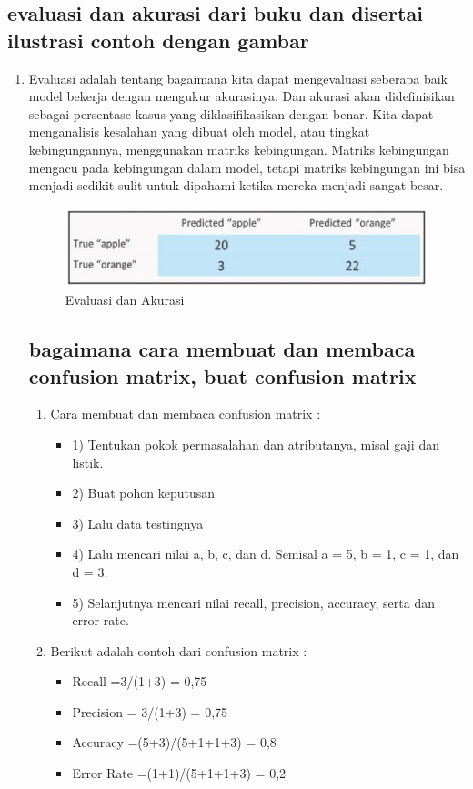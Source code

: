 \begin{enumerate}
\subsection{evaluasi dan akurasi dari buku dan disertai ilustrasi contoh
dengan gambar}
\begin{enumerate}
\item Evaluasi adalah tentang  bagaimana kita dapat mengevaluasi seberapa baik model bekerja dengan mengukur akurasinya. Dan akurasi akan didefinisikan sebagai persentase kasus yang diklasifikasikan dengan benar. Kita dapat menganalisis kesalahan yang dibuat oleh model, atau tingkat kebingungannya, menggunakan matriks kebingungan. Matriks kebingungan mengacu pada kebingungan dalam model, tetapi matriks kebingungan ini bisa menjadi sedikit sulit untuk dipahami ketika mereka menjadi sangat besar.
\begin{figure}[ht]
\centering
\includegraphics[scale=0.5]{figures/f9.jpg}
\caption{ Evaluasi dan Akurasi}
\label{contoh}
\end{figure}

\subsection{ bagaimana cara membuat dan membaca confusion matrix, buat confusion matrix }
\begin{enumerate}
\item Cara membuat dan membaca confusion matrix :
\begin{itemize}
\item 1)	Tentukan pokok permasalahan dan atributanya, misal gaji dan listik.
\item 2)	Buat pohon keputusan
\item 3)	Lalu data testingnya
\item 4)	Lalu mencari nilai a, b, c, dan d. Semisal a = 5, b = 1, c = 1, dan d = 3.
\item 5)	Selanjutnya mencari nilai recall, precision, accuracy, serta dan error rate.
\end{itemize}
\item Berikut adalah contoh dari confusion matrix :
\begin{itemize}
\item Recall =3/(1+3) = 0,75
\item Precision = 3/(1+3) = 0,75
\item Accuracy =(5+3)/(5+1+1+3) = 0,8
\item Error Rate =(1+1)/(5+1+1+3) = 0,2
\end{itemize}


\end{enumerate}
\end{enumerate}
\end{enumerate}
